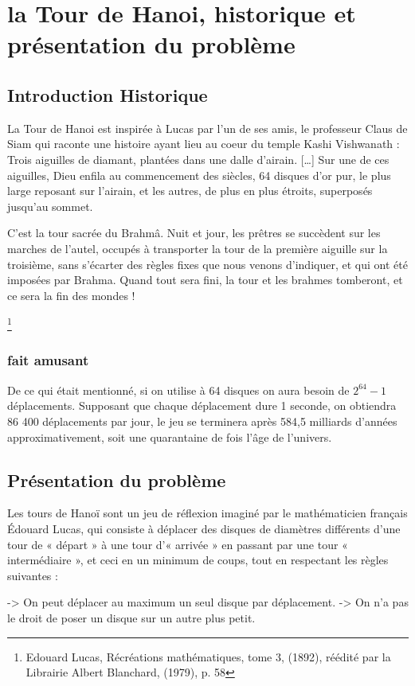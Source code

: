\chapter{la Tour de Hanoi, historique et présentation du problème}

\section{Introduction Historique}
La Tour de Hanoi est inspirée à Lucas par l’un de ses amis, le professeur Claus de Siam qui raconte une histoire ayant lieu au coeur du temple Kashi Vishwanath :
Trois aiguilles de diamant, plantées dans une dalle d’airain. […] Sur une de ces aiguilles, Dieu enfila au commencement des siècles, 64 disques d’or pur, le plus large reposant sur l’airain, et les autres, de plus en plus étroits, superposés jusqu’au sommet.

C’est la tour sacrée du Brahmâ. Nuit et jour, les prêtres se succèdent sur les marches de l’autel, occupés à transporter la tour de la première aiguille sur la troisième, sans s’écarter des règles fixes que nous venons d’indiquer, et qui ont été imposées par Brahma. Quand tout sera fini, la tour et les brahmes tomberont, et ce sera la fin des mondes !

\footnote{Edouard Lucas, Récréations mathématiques, tome 3, (1892), réédité par la Librairie Albert Blanchard, (1979), p. 58}
\subsection{fait amusant}
De ce qui était mentionné, si on utilise à 64 disques on aura besoin de $2^{64}-1$ déplacements. Supposant que chaque déplacement dure 1 seconde, on obtiendra 86 400 déplacements par jour, le jeu se terminera après 584,5 milliards d'années approximativement, soit une quarantaine de fois l'âge de l'univers.  \cite{website1}

\section{Présentation du problème}
Les tours de Hanoï sont un jeu de réflexion imaginé par le mathématicien français Édouard Lucas, qui consiste à déplacer des disques de diamètres différents d'une tour de « départ » à une tour d'« arrivée » en passant par une tour « intermédiaire », et ceci en un minimum de coups, tout en respectant les règles suivantes\cite{website2} :

-> On peut déplacer au maximum un seul disque par déplacement.
-> On n'a pas le droit de poser un disque sur un autre plus petit.

